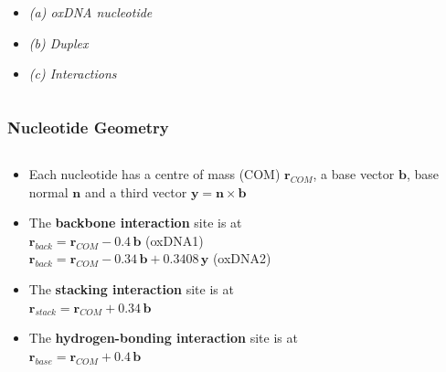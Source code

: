 \documentclass[slidestop,compress,9pt]{beamer}
\begin{document}
\begin{frame}
\begin{columns}
\begin{column}{0.45\textwidth}
\begin{center}
\vspace*{0.5cm}
\begin{itemize}
\setlength\itemsep{7pt}
\item[] \textit{(a) oxDNA nucleotide}
\item[] \textit{(b) Duplex}
\item[] \textit{(c) Interactions}
\end{itemize}
\end{center}
\end{column}
\end{columns}

\end{frame}

\begin{frame}
\frametitle{Nucleotide Geometry}

\begin{columns}
\begin{column}{0.56\textwidth}
\begin{itemize}
\setlength\itemsep{20pt}
\item Each nucleotide has a centre of mass (COM) $\bm{r}_{COM}$, a base vector $\bm{b}$, base normal $\bm{n}$ and a third vector $\bm{y}=\bm{n}\times\bm{b}$
\item The \textbf{backbone interaction} site is at\\
$\bm{r}_{back}=\bm{r}_{COM} - 0.4\,\bm{b}$ \hspace{1.7cm}(oxDNA1)\\
$\bm{r}_{back}=\bm{r}_{COM} - 0.34\, \bm{b} + 0.3408\,\bm{y}$ (oxDNA2)
\item The \textbf{stacking interaction} site is at\\
$\bm{r}_{stack}=\bm{r}_{COM} + 0.34\, \bm{b}$
\item The \textbf{hydrogen-bonding interaction} site is at\\
$\bm{r}_{base}=\bm{r}_{COM} + 0.4\, \bm{b}$
\end{itemize}
\end{column}


\end{columns}
\end{frame}
\end{document}

